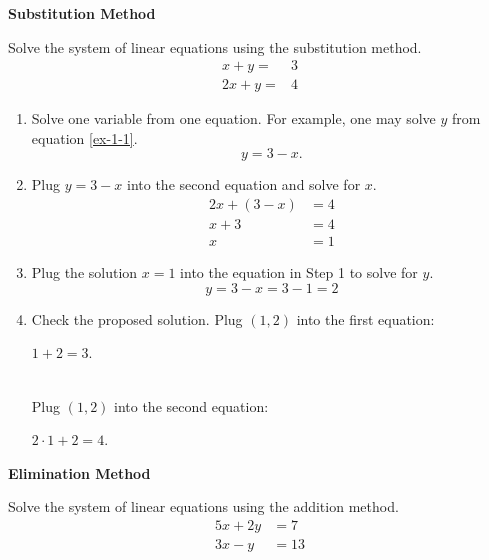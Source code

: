 	\begin{multicols}{2}
		\centerline{\textbf{Substitution Method}}
		\begin{example}
			Solve the system of linear equations using the substitution method.
			\begin{align}
				x + y =  & 3  \label{ex-1-1}\\
				2x + y = & 4
			\end{align}
		\end{example}

		\begin{solution}\mbox{}
			\begin{enumerate}[label={\textbf{\textup{Step \arabic*.}}~}]
				\item Solve one variable from one equation. For example, one may solve $y$ from equation \eqref{ex-1-1}.
				      \[y=3-x.\]

				\item Plug $y=3-x$ into the second equation and solve for $x$.
				      \begin{align*}
					      2x + (3-x) & = 4 \\
					      x+3        & =4  \\
					      x          & =1
				      \end{align*}

				\item Plug the solution $x=1$ into the equation in Step 1 to solve for $y$.
				      \[
					      y =3-x=3-1=2
				      \]

				\item Check the proposed solution.
				      Plug $(1, 2)$ into the first equation:\\
				      \centerline{$1+2=3$.}\\
				      Plug $(1, 2)$ into the second equation:\\
				      \centerline{$2\cdot 1+2=4$.}
			\end{enumerate}
		\end{solution}
		

		\columnbreak

		\centerline{\textbf{Elimination Method}}
		\begin{example}
			\setcounter{equation}{0}
			Solve the system of linear equations using the addition method.
			\begin{align}
				5x + 2y & = 7  \label{ex-2-1} \\
				3x - y  & = 13
			\end{align}
		\end{example}


\end{multicols}
